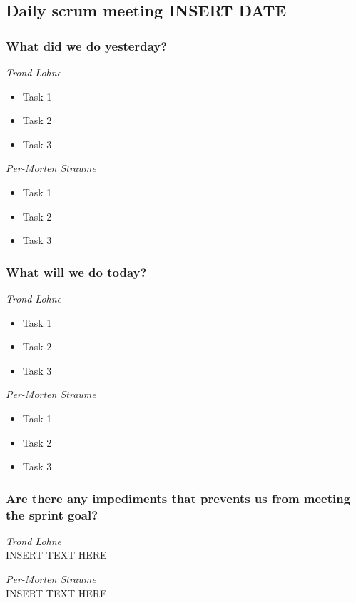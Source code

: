 \documentclass{article}
\begin{document}
\begin{center}
\subsection*{Daily scrum meeting INSERT DATE}
\end{center}
\bigskip


\subsubsection*{What did we do yesterday?}

\noindent\textit{Trond Lohne}
\begin{itemize}
	\item 
	Task 1
	
	\item 
	Task 2
	
	\item 
	Task 3
\end{itemize}

\medskip

\noindent\textit{Per-Morten Straume}
\begin{itemize}
	\item 
	Task 1
	
	\item 
	Task 2
	
	\item 
	Task 3
\end{itemize}


\subsubsection*{What will we do today?}

\noindent\textit{Trond Lohne}
\begin{itemize}
	\item 
	Task 1
	
	\item 
	Task 2
	
	\item 
	Task 3
\end{itemize}

\medskip

\noindent\textit{Per-Morten Straume}
\begin{itemize}
	\item 
	Task 1
	
	\item 
	Task 2
	
	\item 
	Task 3
\end{itemize}


\subsubsection*{Are there any impediments that prevents us from meeting the sprint goal?}

\noindent\textit{Trond Lohne}\\
INSERT TEXT HERE

\medskip

\noindent\textit{Per-Morten Straume}\\
INSERT TEXT HERE
\end{document}
